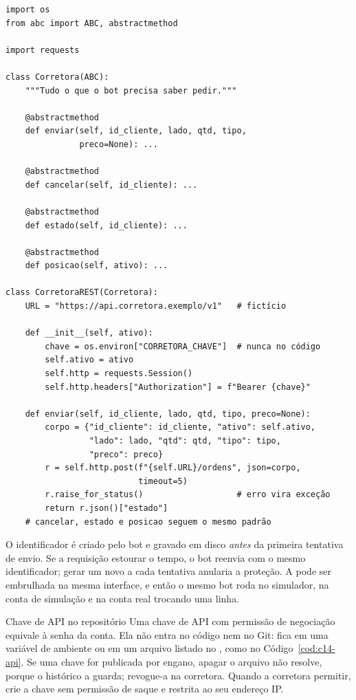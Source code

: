 \begin{lstlisting}[style=py, caption={Esboço não executado de uma interface de corretora e de um adaptador REST}, label=cod:c14-api]
import os
from abc import ABC, abstractmethod

import requests

class Corretora(ABC):
    """Tudo o que o bot precisa saber pedir."""

    @abstractmethod
    def enviar(self, id_cliente, lado, qtd, tipo,
               preco=None): ...

    @abstractmethod
    def cancelar(self, id_cliente): ...

    @abstractmethod
    def estado(self, id_cliente): ...

    @abstractmethod
    def posicao(self, ativo): ...

class CorretoraREST(Corretora):
    URL = "https://api.corretora.exemplo/v1"   # fictício

    def __init__(self, ativo):
        chave = os.environ["CORRETORA_CHAVE"]  # nunca no código
        self.ativo = ativo
        self.http = requests.Session()
        self.http.headers["Authorization"] = f"Bearer {chave}"

    def enviar(self, id_cliente, lado, qtd, tipo, preco=None):
        corpo = {"id_cliente": id_cliente, "ativo": self.ativo,
                 "lado": lado, "qtd": qtd, "tipo": tipo,
                 "preco": preco}
        r = self.http.post(f"{self.URL}/ordens", json=corpo,
                           timeout=5)
        r.raise_for_status()                   # erro vira exceção
        return r.json()["estado"]
    # cancelar, estado e posicao seguem o mesmo padrão
\end{lstlisting}

O identificador  é criado pelo bot e gravado em disco \emph{antes} da primeira tentativa de envio. Se a requisição estourar o tempo, o bot reenvia com o mesmo identificador; gerar um novo a cada tentativa anularia a proteção. A  pode ser embrulhada na mesma interface, e então o mesmo bot roda no simulador, na conta de simulação e na conta real trocando uma linha.

\begin{armadilha}{Chave de API no repositório}
Uma chave de API com permissão de negociação equivale à senha da conta. Ela não entra no código nem no Git: fica em uma variável de ambiente ou em um arquivo listado no , como no Código~\ref{cod:c14-api}. Se uma chave for publicada por engano, apagar o arquivo não resolve, porque o histórico a guarda; revogue-a na corretora. Quando a corretora permitir, crie a chave sem permissão de saque e restrita ao seu endereço IP.
\end{armadilha}

